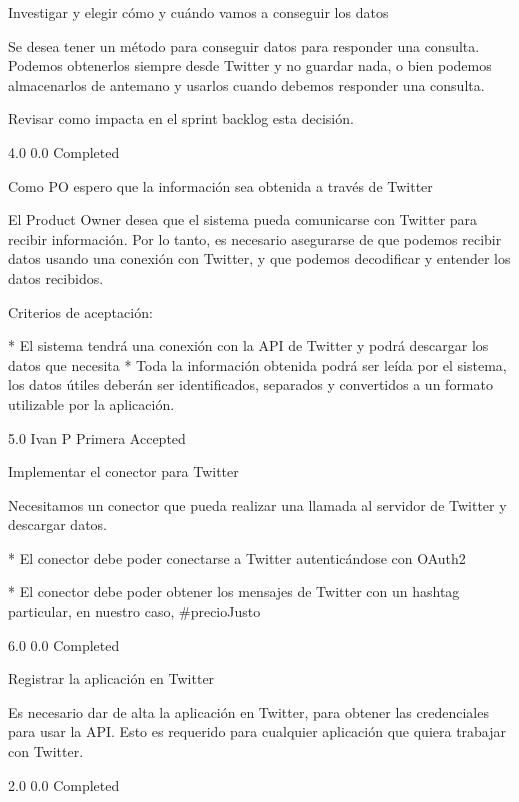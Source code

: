		{Investigar y elegir cómo y cuándo vamos a conseguir los datos} %
		{Se desea tener un método para conseguir datos para responder una consulta.
Podemos obtenerlos siempre desde Twitter y no guardar nada, o bien podemos
almacenarlos de antemano y usarlos cuando debemos responder una consulta.

Revisar como impacta en el sprint backlog esta decisión.

} %
		{4.0} %
		{} %
		{0.0} %
		{Completed} %


\vspace{20pt}

	{Como PO espero que la información sea obtenida a través de Twitter} %
	{El Product Owner desea que el sistema pueda comunicarse con Twitter para
recibir información. Por lo tanto, es necesario asegurarse de que podemos
recibir datos usando una conexión con Twitter, y que podemos decodificar y
entender los datos recibidos.

  
Criterios de aceptación:

* El sistema tendrá una conexión con la API de Twitter y podrá descargar los datos que necesita  
* Toda la información obtenida podrá ser leída por el sistema, los datos útiles deberán ser identificados, separados y convertidos a un formato utilizable por la aplicación.

} %
	{} %
	{5.0} %
	{Ivan P} %
	{Primera} %
	{Accepted} %

		{Implementar el conector para Twitter} %
		{Necesitamos un conector que pueda realizar una llamada al servidor de Twitter
y descargar datos.

* El conector debe poder conectarse a Twitter autenticándose con OAuth2

* El conector debe poder obtener los mensajes de Twitter con un hashtag particular, en nuestro caso, #precioJusto

} %
		{6.0} %
		{} %
		{0.0} %
		{Completed} %

		{Registrar la aplicación en Twitter} %
		{Es necesario dar de alta la aplicación en Twitter, para obtener las
credenciales para usar la API. Esto es requerido para cualquier aplicación que
quiera trabajar con Twitter.

} %
		{2.0} %
		{} %
		{0.0} %
		{Completed} %

